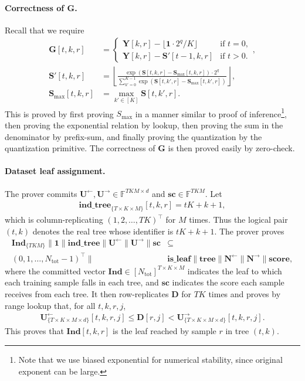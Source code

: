 \paragraph{Correctness of $\mathbf{G}$.}
Recall that we require
\[
\begin{aligned}
    \mathbf{G}[t, k, r] &= \begin{cases}
        \mathbf{Y}[k, r]-\lfloor\mathbf{1}\cdot 2^q/K\rfloor & \text{if } t=0,\\
        \mathbf{Y}[k, r] - \mathbf{S}'[t-1, k, r] & \text{if } t>0.
    \end{cases},\\
    \mathbf{S}'[t, k, r] &= \left\lfloor\frac{\exp(\mathbf{S}[t, k, r] - \mathbf{S}_{\mathrm{max}}[t, k, r])\cdot 2^q}{\sum_{k'=0}^{K-1} \exp(\mathbf{S}[t, k', r] - \mathbf{S}_{\mathrm{max}}[t, k', r])}\right\rfloor,\\
    \mathbf{S}_{\mathrm{max}}[t,k , r] &= \max_{k'\in[K]} \mathbf{S}[t, k', r].
\end{aligned}
\]
This is proved by first proving $S_{\mathrm{max}}$ in a manner
similar to proof of inference\footnote{Note that we use biased exponential for numerical stability, since original exponent can be large.}, then proving the exponential relation by lookup, then proving the sum in the denominator by prefix-sum, and finally proving the quantization by the quantization primitive. The correctness of $\mathbf{G}$ is then proved easily by zero-check.

\paragraph{Dataset leaf assignment.}
The prover commits
$\mathbf{U}^{\leftarrow},\mathbf{U}^{\rightarrow}
\in\mathbb{F}^{TKM\times d}$ and
$\mathbf{sc}\in\mathbb{F}^{TKM}$.
Let
\begin{align}
    \mathbf{ind\_tree}_{\{T\times K\times M\}}[t,k,r]=tK+k+1,
\end{align}
which is column-replicating $(1, 2, \dots, TK)^\top$ for $M$ times. Thus the
logical pair $(t,k)$ denotes the real tree whose identifier is $tK+k+1$.
The prover proves
\begin{align}
    \mathbf{Ind}_{\{TKM\}}\|\mathbf{1}\|\mathbf{ind\_tree}\|
    \mathbf{U}^{\leftarrow}\|\mathbf{U}^{\rightarrow}\|\mathbf{sc}
    &\subseteq\\
    (0,1,\dots,N_{\mathrm{tot}}-1)^\top\|&
    \mathbf{is\_leaf}\|\mathbf{tree}\|\mathbf{N}^{\leftarrow}\|\mathbf{N}^{\rightarrow}\| \mathbf{score},
\end{align}
where the committed vector $\mathbf{Ind}\in [N_{\mathrm{tot}}]^{T\times K\times M}$
indicates the leaf to which each training sample falls in each tree, and
$\mathbf{sc}$ indicates the score each sample receives from each tree.
It then row-replicates $\mathbf{D}$ for $TK$ times and proves by range lookup
that, for all $t,k,r,j$,
\begin{align}
    \mathbf{U}^{\leftarrow}_{\{T\times K\times M\times d\}}[t,k,r,j]
    \leq
    \mathbf{D}[r,j]
    <
    \mathbf{U}^{\rightarrow}_{\{T\times K\times M\times d\}}[t,k,r,j].
\end{align}
This proves that $\mathbf{Ind}[t,k,r]$ is the leaf reached by sample $r$ in
tree $(t,k)$.

